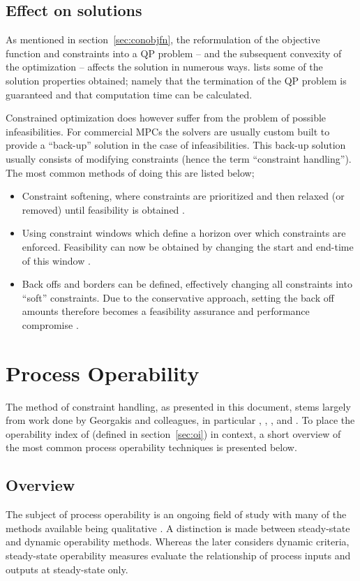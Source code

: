 \subsection{Effect on solutions}\label{sec:coneffsol}
As mentioned in section~\ref{sec:conobjfn}, the reformulation of the objective function and constraints into a QP problem -- and the subsequent convexity of the optimization -- affects the solution in numerous ways.
\citet[83]{maciejowskimpc} lists some of the solution properties obtained; namely that the termination of the QP problem is guaranteed and that computation time can be calculated.

Constrained optimization does however suffer from the problem of possible infeasibilities. 
For commercial MPCs the solvers are usually custom built to provide a ``back-up'' solution in the case of infeasibilities.
This back-up solution usually consists of modifying constraints (hence the term ``constraint handling'').
The most common methods of doing this are listed below;
\begin{itemize}
\item Constraint softening, where constraints are prioritized and then relaxed (or removed) until feasibility is obtained \citep[160]{rossiter}.
\item Using constraint windows which define a horizon over which constraints are enforced.
Feasibility can now be obtained by changing the start and end-time of this window \citep[281-282]{maciejowskimpc}.
\item Back offs and borders can be defined, effectively changing all constraints into ``soft'' constraints.
Due to the conservative approach, setting the back off amounts therefore becomes a feasibility assurance and performance compromise .
\end{itemize}

\section{Process Operability}
The method of constraint handling, as presented in this document, stems largely from work done by Georgakis and colleagues, in particular \citet{vinsonphd}, \citet{vinsonartoi}, \citet{limaphd}, \citet{opconproc} and \citet{opidealrx}. 
To place the operability index of \citet{vinsonphd} (defined in section~\ref{sec:oi}) in context, a short overview of the most common process operability techniques is presented below.

\subsection{Overview}
The subject of process operability is an ongoing field of study with many of the methods available being qualitative \citep[164]{skogestad}. 
A distinction is made between steady-state and dynamic operability methods. 
Whereas the later considers dynamic criteria, steady-state operability measures evaluate the relationship of process inputs and outputs at steady-state only.

